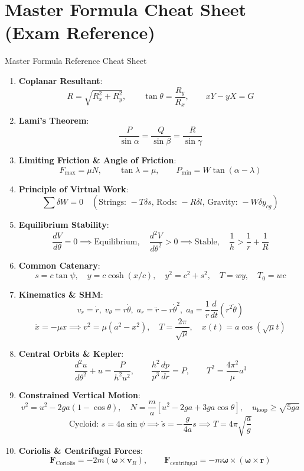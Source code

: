 \documentclass[11pt,a4paper]{article}
\begin{document}
\section{Master Formula Cheat Sheet (Exam Reference)}

\begin{importantbox}{Master Formula Reference Cheat Sheet}
\begin{enumerate}[leftmargin=1.5em]
    \item \textbf{Coplanar Resultant}:
    \[ R = \sqrt{R_x^2 + R_y^2}, \qquad \tan\theta = \frac{R_y}{R_x}, \qquad x Y - y X = G \]
    \item \textbf{Lami's Theorem}:
    \[ \frac{P}{\sin\alpha} = \frac{Q}{\sin\beta} = \frac{R}{\sin\gamma} \]
    \item \textbf{Limiting Friction \& Angle of Friction}:
    \[ F_{\max} = \mu N, \qquad \tan\lambda = \mu, \qquad P_{\min} = W\tan(\alpha-\lambda) \]
    \item \textbf{Principle of Virtual Work}:
    \[ \sum \delta W = 0 \quad (\text{Strings: } -T\delta s, \, \text{Rods: } -R\delta l, \, \text{Gravity: } -W\delta y_{cg}) \]
    \item \textbf{Equilibrium Stability}:
    \[ \frac{dV}{d\theta} = 0 \implies \text{Equilibrium}, \quad \frac{d^2V}{d\theta^2} > 0 \implies \text{Stable}, \quad \frac{1}{h} > \frac{1}{r} + \frac{1}{R} \]
    \item \textbf{Common Catenary}:
    \[ s = c\tan\psi, \quad y = c\cosh(x/c), \quad y^2 = c^2+s^2, \quad T = wy, \quad T_0 = wc \]
    \item \textbf{Kinematics \& SHM}:
    \[ v_r = \dot{r}, \; v_\theta = r\dot{\theta}, \; a_r = \ddot{r}-r\dot{\theta}^2, \; a_\theta = \frac{1}{r}\frac{d}{dt}(r^2\dot{\theta}) \]
    \[ \ddot{x} = -\mu x \implies v^2 = \mu(a^2-x^2), \quad T = \frac{2\pi}{\sqrt{\mu}}, \quad x(t) = a\cos(\sqrt{\mu}t) \]
    \item \textbf{Central Orbits \& Kepler}:
    \[ \frac{d^2u}{d\theta^2} + u = \frac{P}{h^2 u^2}, \qquad \frac{h^2}{p^3}\frac{dp}{dr} = P, \qquad T^2 = \frac{4\pi^2}{\mu}a^3 \]
    \item \textbf{Constrained Vertical Motion}:
    \[ v^2 = u^2 - 2ga(1-\cos\theta), \quad N = \frac{m}{a}[u^2 - 2ga + 3ga\cos\theta], \quad u_{\text{loop}} \ge \sqrt{5ga} \]
    \[ \text{Cycloid: } s = 4a\sin\psi \implies \ddot{s} = -\frac{g}{4a}s \implies T = 4\pi\sqrt{\frac{a}{g}} \]
    \item \textbf{Coriolis \& Centrifugal Forces}:
    \[ \mathbf{F}_{\text{Coriolis}} = -2m(\boldsymbol{\omega} \times \mathbf{v}_R), \qquad \mathbf{F}_{\text{centrifugal}} = -m\boldsymbol{\omega} \times (\boldsymbol{\omega} \times \mathbf{r}) \]
\end{enumerate}
\end{importantbox}
\end{document}
